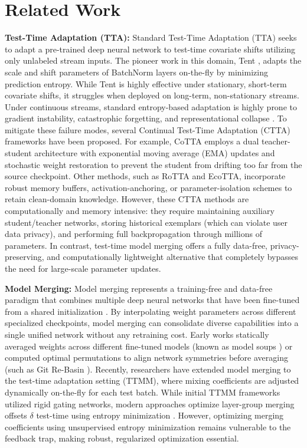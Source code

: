 \documentclass{article}
\theoremstyle{plain}
\theoremstyle{definition}
\theoremstyle{remark}
\begin{document}
\section{Related Work}
\label{sec:related}
\textbf{Test-Time Adaptation (TTA):} Standard Test-Time Adaptation (TTA) seeks to adapt a pre-trained deep neural network to test-time covariate shifts utilizing only unlabeled stream inputs. The pioneer work in this domain, Tent \cite{wang2021tent}, adapts the scale and shift parameters of BatchNorm layers on-the-fly by minimizing prediction entropy. While Tent is highly effective under stationary, short-term covariate shifts, it struggles when deployed on long-term, non-stationary streams. Under continuous streams, standard entropy-based adaptation is highly prone to gradient instability, catastrophic forgetting, and representational collapse \cite{liang2023comprehensive}. To mitigate these failure modes, several Continual Test-Time Adaptation (CTTA) frameworks have been proposed. For example, CoTTA \cite{cotta} employs a dual teacher-student architecture with exponential moving average (EMA) updates and stochastic weight restoration to prevent the student from drifting too far from the source checkpoint. Other methods, such as RoTTA \cite{rotta} and EcoTTA, incorporate robust memory buffers, activation-anchoring, or parameter-isolation schemes to retain clean-domain knowledge. However, these CTTA methods are computationally and memory intensive: they require maintaining auxiliary student/teacher networks, storing historical exemplars (which can violate user data privacy), and performing full backpropagation through millions of parameters. In contrast, test-time model merging offers a fully data-free, privacy-preserving, and computationally lightweight alternative that completely bypasses the need for large-scale parameter updates.

\textbf{Model Merging:} Model merging represents a training-free and data-free paradigm that combines multiple deep neural networks that have been fine-tuned from a shared initialization \cite{wortsman2022model, liesenfeld2023comerge, jin2023dcl}. By interpolating weight parameters across different specialized checkpoints, model merging can consolidate diverse capabilities into a single unified network without any retraining cost. Early works statically averaged weights across different fine-tuned models (known as model soups \cite{wortsman2022model}) or computed optimal permutations to align network symmetries before averaging (such as Git Re-Basin \cite{rebasin}). Recently, researchers have extended model merging to the test-time adaptation setting (TTMM), where mixing coefficients are adjusted dynamically on-the-fly for each test batch. While initial TTMM frameworks utilized rigid gating networks, modern approaches optimize layer-group merging offsets $\delta$ test-time using entropy minimization \cite{sam_ttmm}. However, optimizing merging coefficients using unsupervised entropy minimization remains vulnerable to the feedback trap, making robust, regularized optimization essential.
\end{document}
